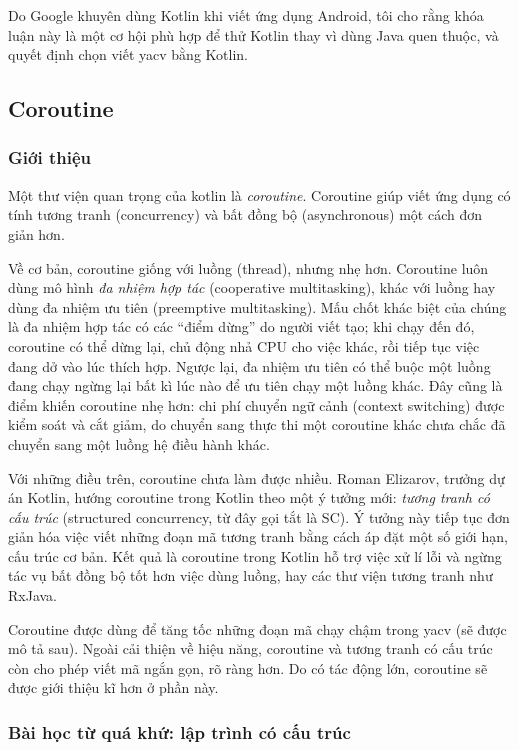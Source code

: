 \documentclass[../../thesis]{subfiles}
\begin{document}
Do Google khuyên dùng Kotlin khi viết ứng dụng Android, tôi cho rằng khóa luận
này là một cơ hội phù hợp để thử Kotlin thay vì dùng Java quen thuộc, và quyết
định chọn viết yacv bằng Kotlin.

\subsection{Coroutine}

\subsubsection{Giới thiệu}

Một thư viện quan trọng của kotlin là \emph{coroutine}. Coroutine giúp viết ứng
dụng có tính tương tranh (concurrency) và bất đồng bộ (asynchronous) một cách
đơn giản hơn.

Về cơ bản, coroutine giống với luồng (thread), nhưng nhẹ hơn. Coroutine luôn
dùng mô hình \emph{đa nhiệm hợp tác} (cooperative multitasking), khác với luồng
hay dùng đa nhiệm ưu tiên (preemptive multitasking). Mấu chốt khác biệt của
chúng là đa nhiệm hợp tác có các ``điểm dừng'' do người viết tạo; khi chạy đến
đó, coroutine có thể dừng lại, chủ động nhả CPU cho việc khác, rồi tiếp tục việc
đang dở vào lúc thích hợp. Ngược lại, đa nhiệm ưu tiên có thể buộc một luồng
đang chạy ngừng lại bất kì lúc nào để ưu tiên chạy một luồng khác. Đây cũng là
điểm khiến coroutine nhẹ hơn: chi phí chuyển ngữ cảnh (context switching) được
kiểm soát và cắt giảm, do chuyển sang thực thi một coroutine khác chưa chắc đã
chuyển sang một luồng hệ điều hành khác.

Với những điều trên, coroutine chưa làm được nhiều. Roman Elizarov, trưởng dự án
Kotlin, hướng coroutine trong Kotlin theo một ý tưởng mới: \emph{tương tranh có
cấu trúc} (structured concurrency, từ đây gọi tắt là SC). Ý tưởng này tiếp tục
đơn giản hóa việc viết những đoạn mã tương tranh bằng cách áp đặt một số giới
hạn, cấu trúc cơ bản. Kết quả là coroutine trong Kotlin hỗ trợ việc xử lí lỗi và
ngừng tác vụ bất đồng bộ tốt hơn việc dùng luồng, hay các thư viện tương tranh
như RxJava.

Coroutine được dùng để tăng tốc những đoạn mã chạy chậm trong yacv (sẽ được mô
tả sau). Ngoài cải thiện về hiệu năng, coroutine và tương tranh có cấu trúc còn
cho phép viết mã ngắn gọn, rõ ràng hơn. Do có tác động lớn, coroutine sẽ được
giới thiệu kĩ hơn ở phần này.

\subsubsection{Bài học từ quá khứ: lập trình có cấu trúc}
\end{document}
